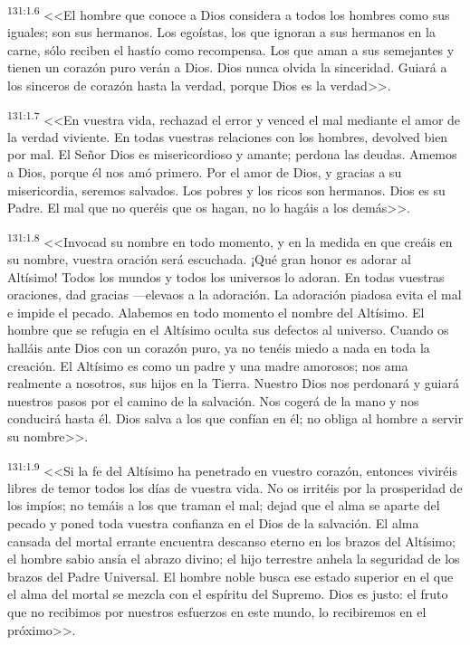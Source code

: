 \par 
\textsuperscript{131:1.6} <<El hombre que conoce a Dios considera a todos los hombres como sus iguales; son sus hermanos. Los egoístas, los que ignoran a sus hermanos en la carne, sólo reciben el hastío como recompensa. Los que aman a sus semejantes y tienen un corazón puro verán a Dios. Dios nunca olvida la sinceridad. Guiará a los sinceros de corazón hasta la verdad, porque Dios es la verdad>>.

\par 
\textsuperscript{131:1.7} <<En vuestra vida, rechazad el error y venced el mal mediante el amor de la verdad viviente. En todas vuestras relaciones con los hombres, devolved bien por mal. El Señor Dios es misericordioso y amante; perdona las deudas. Amemos a Dios, porque él nos amó primero. Por el amor de Dios, y gracias a su misericordia, seremos salvados. Los pobres y los ricos son hermanos. Dios es su Padre. El mal que no queréis que os hagan, no lo hagáis a los demás>>.

\par 
\textsuperscript{131:1.8} <<Invocad su nombre en todo momento, y en la medida en que creáis en su nombre, vuestra oración será escuchada. ¡Qué gran honor es adorar al Altísimo! Todos los mundos y todos los universos lo adoran. En todas vuestras oraciones, dad gracias ---elevaos a la adoración. La adoración piadosa evita el mal e impide el pecado. Alabemos en todo momento el nombre del Altísimo. El hombre que se refugia en el Altísimo oculta sus defectos al universo. Cuando os halláis ante Dios con un corazón puro, ya no tenéis miedo a nada en toda la creación. El Altísimo es como un padre y una madre amorosos; nos ama realmente a nosotros, sus hijos en la Tierra. Nuestro Dios nos perdonará y guiará nuestros pasos por el camino de la salvación. Nos cogerá de la mano y nos conducirá hasta él. Dios salva a los que confían en él; no obliga al hombre a servir su nombre>>.

\par 
\textsuperscript{131:1.9} <<Si la fe del Altísimo ha penetrado en vuestro corazón, entonces viviréis libres de temor todos los días de vuestra vida. No os irritéis por la prosperidad de los impíos; no temáis a los que traman el mal; dejad que el alma se aparte del pecado y poned toda vuestra confianza en el Dios de la salvación. El alma cansada del mortal errante encuentra descanso eterno en los brazos del Altísimo; el hombre sabio ansía el abrazo divino; el hijo terrestre anhela la seguridad de los brazos del Padre Universal. El hombre noble busca ese estado superior en el que el alma del mortal se mezcla con el espíritu del Supremo. Dios es justo: el fruto que no recibimos por nuestros esfuerzos en este mundo, lo recibiremos en el próximo>>.

